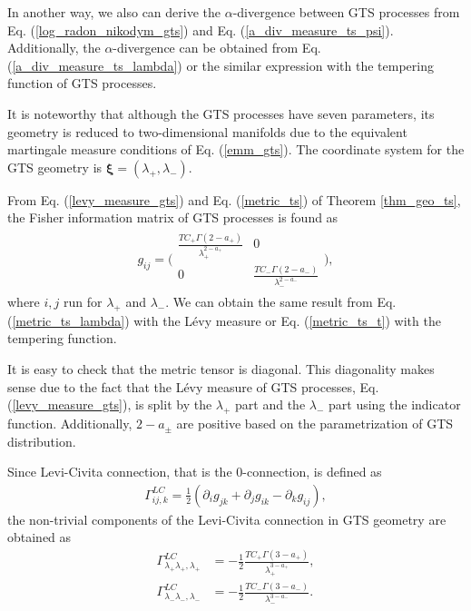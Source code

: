 \documentclass[preprint,11pt]{amsart}
\begin{document}
	In another way, we also can derive the $\alpha$-divergence between GTS processes from Eq. (\ref{log_radon_nikodym_gts}) and Eq. (\ref{a_div_measure_ts_psi}). Additionally, the $\alpha$-divergence can be obtained from Eq. (\ref{a_div_measure_ts_lambda}) or the similar expression with the tempering function of GTS processes.
	
	It is noteworthy that although the GTS processes have seven parameters, its geometry is reduced to two-dimensional manifolds due to the equivalent martingale measure conditions of Eq. (\ref{emm_gts}). The coordinate system for the GTS geometry is $\boldsymbol{\xi}=(\lambda_+,\lambda_-)$.
	
	From Eq. (\ref{levy_measure_gts}) and Eq. (\ref{metric_ts}) of Theorem \ref{thm_geo_ts}, the Fisher information matrix of GTS processes is found as
	\begin{align}
	\label{metric_gts}
		g_{ij}=\Bigg(
		\begin{array}{cc}
			\frac{TC_+\Gamma(2-a_+)}{\lambda_+^{2-a_+}} &0 \\ 
			0 & \frac{TC_-\Gamma(2-a_-)}{\lambda_-^{2-a_-}}
		\end{array}\Bigg),
	\end{align}
	where $i, j$ run for $\lambda_+$ and $\lambda_-$. We can obtain the same result from Eq. (\ref{metric_ts_lambda}) with the L\'evy measure or Eq. (\ref{metric_ts_t}) with the tempering function.
	
	It is easy to check that the metric tensor is diagonal. This diagonality makes sense due to the fact that the L\'evy measure of GTS processes, Eq. (\ref{levy_measure_gts}), is split by the $\lambda_+$ part and the $\lambda_-$ part using the indicator function. Additionally, $2-a_{\pm}$ are positive based on the parametrization of GTS distribution.
	
	Since Levi-Civita connection, that is the $0$-connection, is defined as
	\begin{align}
	\label{lc_conn}
		\Gamma^{LC}_{ij,k}=\frac{1}{2}(\partial_i g_{jk} +\partial_j g_{ik}-\partial_k g_{ij}),
	\end{align}
	the non-trivial components of the Levi-Civita connection in GTS geometry are obtained as
	\begin{align}
	\label{lc_conn_gts_p}
		\Gamma^{LC}_{\lambda_+\lambda_+,\lambda_+}&=-\frac{1}{2}\frac{TC_+\Gamma(3-a_+)}{\lambda_+^{3-a_+}},\\
	\label{lc_conn_gts_m}
		\Gamma^{LC}_{\lambda_-\lambda_-,\lambda_-}&=-\frac{1}{2}\frac{TC_-\Gamma(3-a_-)}{\lambda_-^{3-a_-}}.
	\end{align}
\end{document}
